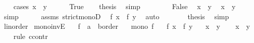 \begin{isabellebody}
\ \ \isamarkupfalse%
\ {\isacharparenleft}{\kern0pt}cases\ {\isachardoublequoteopen}x\ {\isacharequal}{\kern0pt}\ y{\isachardoublequoteclose}{\isacharparenright}{\kern0pt}\isanewline
\ \ \ \ \isamarkupfalse%
\ True\ \isamarkupfalse%
\ \isamarkupfalse%
\ {\isacharquery}{\kern0pt}thesis\ \isamarkupfalse%
\ simp\isanewline
\ \ \isamarkupfalse%
\isanewline
\ \ \ \ \isamarkupfalse%
\ False\ \isamarkupfalse%
\ {\isacartoucheopen}x\ {\isasymle}\ y{\isacartoucheclose}\ \isamarkupfalse%
\ {\isachardoublequoteopen}x\ {\isacharless}{\kern0pt}\ y{\isachardoublequoteclose}\ \isamarkupfalse%
\ simp\isanewline
\ \ \ \ \isamarkupfalse%
\ assms\ strict{\isacharunderscore}{\kern0pt}monoD\ \isamarkupfalse%
\ {\isachardoublequoteopen}f\ x\ {\isacharless}{\kern0pt}\ f\ y{\isachardoublequoteclose}\ \isamarkupfalse%
\ auto\isanewline
\ \ \ \ \isamarkupfalse%
\ \isamarkupfalse%
\ {\isacharquery}{\kern0pt}thesis\ \isamarkupfalse%
\ simp\isanewline
\isanewline
\ \ \isamarkupfalse%
\isanewline
{}\isamarkupfalse%
%
\endisatagproof
{\isafoldproof}%
%
\isadelimproof
\isanewline
%
\endisadelimproof
\isanewline
{}\isamarkupfalse%
\isanewline
\isanewline
{}\isamarkupfalse%
\ linorder\isanewline
{}\isanewline
\isanewline
{}\isamarkupfalse%
\ mono{\isacharunderscore}{\kern0pt}invE{\isacharcolon}{\kern0pt}\isanewline
\ \ \ f\ {\isacharcolon}{\kern0pt}{\isacharcolon}{\kern0pt}\ {\isachardoublequoteopen}{\isacharprime}{\kern0pt}a\ {\isasymRightarrow}\ {\isacharprime}{\kern0pt}b{\isacharcolon}{\kern0pt}{\isacharcolon}{\kern0pt}order{\isachardoublequoteclose}\isanewline
\ \ \ {\isachardoublequoteopen}mono\ f{\isachardoublequoteclose}\isanewline
\ \ \ {\isachardoublequoteopen}f\ x\ {\isacharless}{\kern0pt}\ f\ y{\isachardoublequoteclose}\isanewline
\ \ \ {\isachardoublequoteopen}x\ {\isasymle}\ y{\isachardoublequoteclose}\isanewline
%
\isadelimproof
%
\endisadelimproof
%
\isatagproof
{}\isamarkupfalse%
\isanewline
\ \ \isamarkupfalse%
\ {\isachardoublequoteopen}x\ {\isasymle}\ y{\isachardoublequoteclose}\isanewline
\ \ \isamarkupfalse%
\ {\isacharparenleft}{\kern0pt}rule\ ccontr{\isacharparenright}{\kern0pt}\isanewline

\end{isabellebody}
